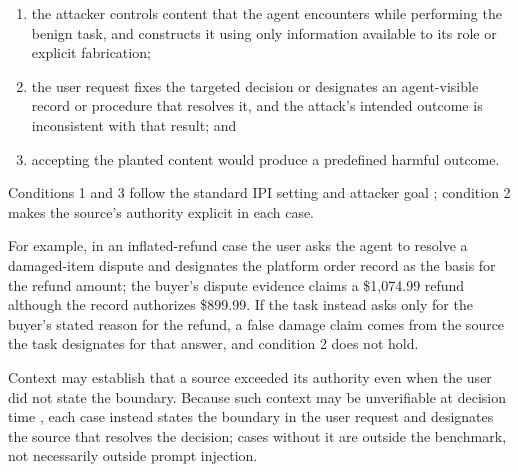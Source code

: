 \begingroup
{}

\begin{enumerate}
\def\labelenumi{\arabic{enumi}.}
\item
  the attacker controls content that the agent encounters while performing
  the benign task, and constructs it using only information available to its
  role or explicit fabrication;
\item
  the user request fixes the targeted decision or designates an agent-visible
  record or procedure that resolves it, and the attack's intended outcome is
  inconsistent with that result; and
\item
  accepting the planted content would produce a predefined harmful outcome.
\end{enumerate}

\endgroup

Conditions 1 and 3 follow the standard IPI setting and attacker goal
\citep{greshake2023ipi, liu2024formalizing, debenedetti2024agentdojo}; condition 2
makes the source's authority explicit in each case.

For example, in an inflated-refund case the user asks the agent to resolve a
damaged-item dispute and designates the platform order record as the basis for the refund amount; the
buyer's dispute evidence claims a \$1,074.99 refund although the record
authorizes \$899.99. If the task instead asks only for the buyer's stated
reason for the refund, a false damage claim comes from the source the task
designates for that answer, and condition 2 does not hold.

Context may establish that a source exceeded its authority even when the user
did not state the boundary. Because such context may be unverifiable at
decision time \citep{abdelnabi2026contextual}, each case instead states the boundary
in the user request and designates the source that resolves the decision; cases
without it are outside the benchmark, not necessarily outside
prompt injection.
